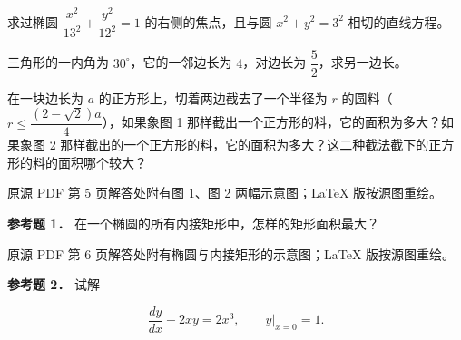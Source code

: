 \begin{question}
求过椭圆 $\dfrac{x^2}{13^2}+\dfrac{y^2}{12^2}=1$ 的右侧的焦点，且与圆 $x^2+y^2=3^2$ 相切的直线方程。

\end{question}
\begin{question}
三角形的一内角为 $30^\circ$，它的一邻边长为 $4$，对边长为 $\dfrac52$，求另一边长。

\Needspace{0.4\textheight}
\end{question}
\begin{question}
在一块边长为 $a$ 的正方形上，切着两边截去了一个半径为 $r$ 的圆料（$r\leqslant\dfrac{(2-\sqrt2)a}{4}$），如果象图 1 那样截出一个正方形的料，它的面积为多大？如果象图 2 那样截出的一个正方形的料，它的面积为多大？这二种截法截下的正方形的料的面积哪个较大？

\begin{gktip}
原源 PDF 第 5 页解答处附有图 1、图 2 两幅示意图；LaTeX 版按源图重绘。
\end{gktip}
\nopagebreak[4]
\begin{center}\end{center}
\nopagebreak[4]
\nopagebreak[4]
\begin{center}\end{center}
\nopagebreak[4]
\textbf{参考题 1．} 在一个椭圆的所有内接矩形中，怎样的矩形面积最大？

\begin{gktip}
原源 PDF 第 6 页解答处附有椭圆与内接矩形的示意图；LaTeX 版按源图重绘。
\end{gktip}
\nopagebreak[4]
\begin{center}\end{center}
\nopagebreak[4]
\textbf{参考题 2．} 试解

\nopagebreak[4]
\[
\frac{dy}{dx}-2xy=2x^3,
\qquad
y\Big|_{x=0}=1.
\]

\end{question}